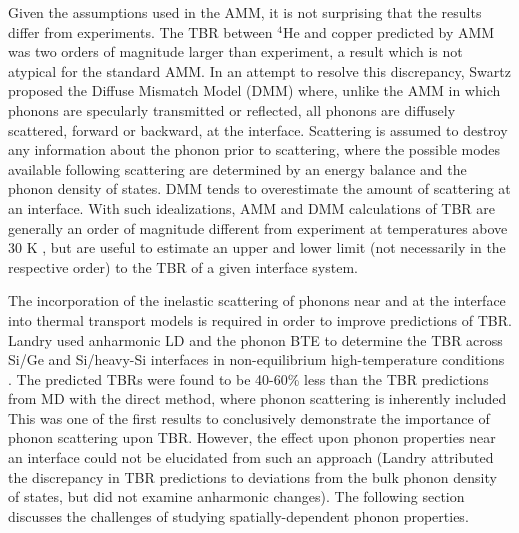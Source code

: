 Given the assumptions used in the AMM, it is not surprising that the results differ from experiments. The TBR between $^4$He and copper predicted by AMM was two orders of magnitude larger than experiment, a result which is not atypical for the standard AMM. In an attempt to resolve this discrepancy, Swartz proposed the Diffuse Mismatch Model (DMM) where, unlike the AMM in which phonons are specularly transmitted or reflected, all phonons are diffusely scattered, forward or backward, at the interface. Scattering is assumed to destroy any information about the phonon prior to scattering, where the possible modes available following scattering are determined by an energy balance and the phonon density of states. DMM tends to overestimate the amount of scattering at an interface. With such idealizations, AMM and DMM calculations of TBR are generally an order of magnitude different from experiment at temperatures above 30 K \cite{landrythesis}, but are useful to estimate an upper and lower limit (not necessarily in the respective order) to the TBR of a given interface system.

The incorporation of the inelastic scattering of phonons near and at the interface  into thermal transport models is required in order to improve predictions of TBR. Landry used anharmonic LD and the phonon BTE to determine the TBR across Si/Ge and Si/heavy-Si interfaces in non-equilibrium high-temperature conditions \cite{landrythesis}. The predicted TBRs were found to be 40-60\% less than the TBR predictions from MD with the direct method, where phonon scattering is inherently included This was one of the first results to conclusively demonstrate the importance of phonon scattering upon TBR. However, the effect upon phonon properties near an interface could not be elucidated from such an approach (Landry attributed the discrepancy in TBR predictions to deviations from the bulk phonon density of states, but did not examine anharmonic changes). The following section discusses the challenges of studying spatially-dependent phonon properties.




